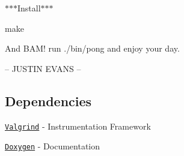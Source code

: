$\ast$$\ast$$\ast$\+Install$\ast$$\ast$$\ast$

{\ttfamily make}

And B\+A\+M! run {\ttfamily ./bin/pong} and enjoy your day.

-- J\+U\+S\+T\+I\+N E\+V\+A\+N\+S --

\subsection*{Dependencies}


\begin{DoxyItemize}
\item \href{http://valgrind.org/}{\tt Valgrind} -\/ Instrumentation Framework
\item \href{http://www.stack.nl/~dimitri/doxygen/}{\tt Doxygen} -\/ Documentation 
\end{DoxyItemize}